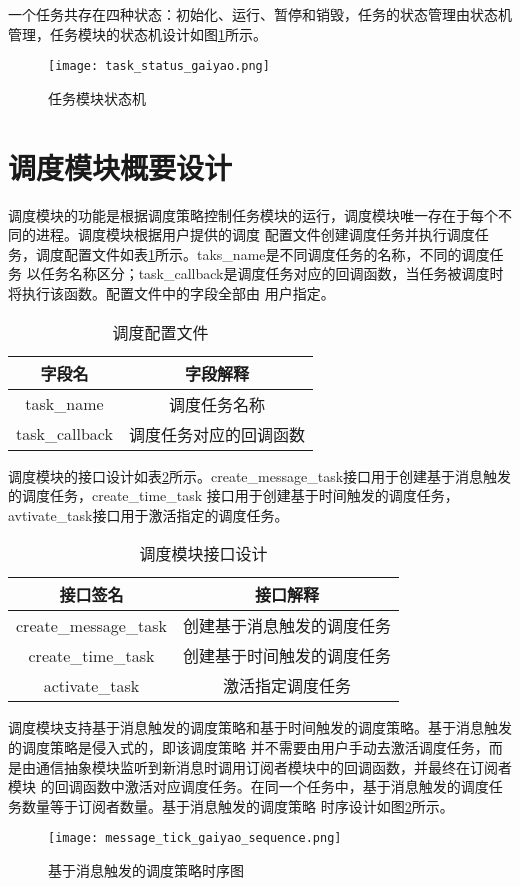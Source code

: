 一个任务共存在四种状态：初始化、运行、暂停和销毁，任务的状态管理由状态机管理，任务模块的状态机设计如图\ref{task_status_gaiyao}所示。
\begin{figure}[H]
  \centering
  \texttt{[image: task\_status\_gaiyao.png]}
  \caption{任务模块状态机}
  \label{task_status_gaiyao}
\end{figure}

\section{调度模块概要设计}
调度模块的功能是根据调度策略控制任务模块的运行，调度模块唯一存在于每个不同的进程。调度模块根据用户提供的调度
配置文件创建调度任务并执行调度任务，调度配置文件如表\ref{schedule_config_file}所示。taks\_name是不同调度任务的名称，不同的调度任务
以任务名称区分；task\_callback是调度任务对应的回调函数，当任务被调度时将执行该函数。配置文件中的字段全部由
用户指定。
\begin{table}[H]
  \centering\small
  \caption{调度配置文件}
  \label{schedule_config_file}
  \begin{tabular}{cc}
    \toprule
    字段名 & 字段解释 \\
    \midrule
    task\_name & 调度任务名称\\
    task\_callback & 调度任务对应的回调函数\\
    \bottomrule
  \end{tabular}
\end{table}

调度模块的接口设计如表\ref{schedule_interface}所示。create\_message\_task接口用于创建基于消息触发的调度任务，create\_time\_task
接口用于创建基于时间触发的调度任务，avtivate\_task接口用于激活指定的调度任务。
\begin{table}[H]
  \centering\small
  \caption{调度模块接口设计}
  \label{schedule_interface}
  \begin{tabular}{cc}
    \toprule
    接口签名 & 接口解释 \\
    \midrule
    create\_message\_task & 创建基于消息触发的调度任务 \\
    create\_time\_task & 创建基于时间触发的调度任务 \\
    activate\_task & 激活指定调度任务 \\
    \bottomrule
  \end{tabular}
\end{table}

调度模块支持基于消息触发的调度策略和基于时间触发的调度策略。基于消息触发的调度策略是侵入式的，即该调度策略
并不需要由用户手动去激活调度任务，而是由通信抽象模块监听到新消息时调用订阅者模块中的回调函数，并最终在订阅者模块
的回调函数中激活对应调度任务。在同一个任务中，基于消息触发的调度任务数量等于订阅者数量。基于消息触发的调度策略
时序设计如图\ref{message_tick_gaiyao_sequence}所示。
\begin{figure}[H]
  \centering
  \texttt{[image: message\_tick\_gaiyao\_sequence.png]}
  \caption{基于消息触发的调度策略时序图}
  \label{message_tick_gaiyao_sequence}
\end{figure}

